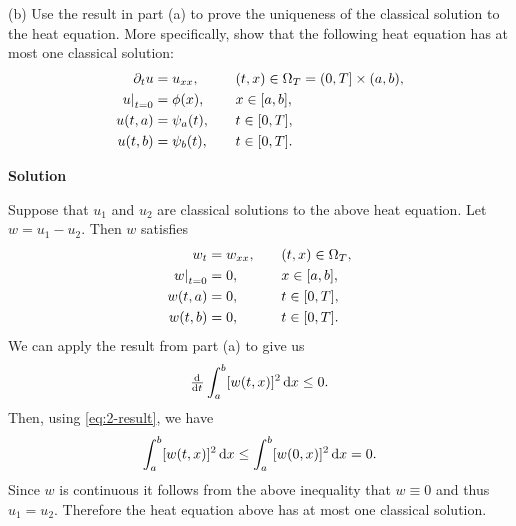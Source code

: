 \documentclass{article}
\begin{document}
\vspace{5mm}

(b) Use the result in part (a) to prove the uniqueness of the classical
solution to the heat equation. More specifically, show that the
following heat equation has at most one classical solution:
%
\begin{alignat*}{2}
    \partial_t u &= u_{x x}, &&\quad (t, x) \in \Omega_T = (0, T] \times (a, b), \\
    \eval[0]{u}_{t = 0} &= \phi(x), &&\quad x \in [a, b], \\
    u(t, a) &= \psi_a(t), &&\quad t \in [0, T], \\
    u(t, b) &= \psi_b(t), &&\quad t \in [0, T].
\end{alignat*}

\textbf{Solution}

Suppose that $u_1$ and $u_2$ are classical solutions to the above heat
equation. Let $w = u_1 - u_2$. Then $w$ satisfies
%
\begin{alignat*}{2}
    w_t &= w_{x x}, &&\quad (t, x) \in \Omega_T, \\
    \eval[0]{w}_{t = 0} &= 0, &&\quad x \in [a, b], \\
    w(t, a) &= 0, &&\quad t \in [0, T], \\
    w(t, b) &= 0, &&\quad t \in [0, T].
\end{alignat*}
%
We can apply the result from part (a) to give us
%
\begin{equation}
    \od{}{t} \int_a^b [w(t, x)]^2 \dif x \leq 0
    \label{eq:2-result}
    .
\end{equation}
%
Then, using \eqref{eq:2-result}, we have
%
\begin{equation*}
    \int_a^b [w(t, x)]^2 \dif x \leq \int_a^b [w(0, x)]^2 \dif x = 0
    .
\end{equation*}
%
Since $w$ is continuous it follows from the above inequality that
$w \equiv 0$ and thus $u_1 = u_2$. Therefore the heat equation above has
at most one classical solution.
\end{document}
